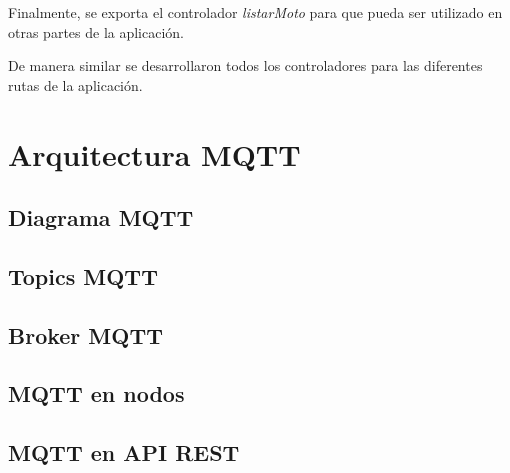 Finalmente, se exporta el controlador \textit{listarMoto} para que pueda ser utilizado en otras partes de la aplicación.

De manera similar se desarrollaron todos los controladores para las diferentes rutas de la aplicación. 

\section{Arquitectura MQTT}
\label{sec:mqttarquitectura}

\subsection{Diagrama MQTT}
\label{subsec:mqttdiagrama}

\subsection{Topics MQTT}
\label{subsec:mqtttopics}

\subsection{Broker MQTT}
\label{subsec:mqttbroker}

\subsection{MQTT en nodos}
\label{subsec:mqttnodos}

\subsection{MQTT en API REST}
\label{subsec:mqttapi}






